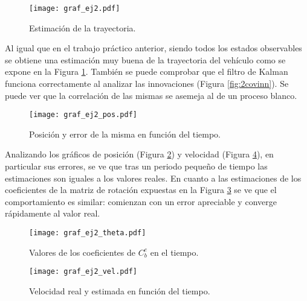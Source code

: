 
\begin{figure}[H]
\centering
\texttt{[image: graf\_ej2.pdf]}
\caption{Estimación de la trayectoria.}
\label{fig:ej2} 
\end{figure}
	Al igual que en el trabajo práctico anterior, siendo todos los estados observables se obtiene una estimación muy buena de la trayectoria del vehículo como se expone en la Figura \ref{fig:ej2}. También se puede comprobar que el filtro de Kalman funciona correctamente al analizar las innovaciones (Figura \ref{fig:2covinn}). Se puede ver que la correlación de las mismas se asemeja al de un proceso blanco.

\vspace*{\fill}
\begin{figure}[H]
\centering
\texttt{[image: graf\_ej2\_pos.pdf]}
\caption{Posición y error de la misma en función del tiempo.}
\label{fig:2pos} 
\end{figure}
\vspace*{\fill}

	Analizando los gráficos de posición (Figura \ref{fig:2pos}) y velocidad (Figura \ref{fig:2vel}), en particular sus errores, se ve que tras un periodo pequeño de tiempo las estimaciones son iguales a los valores reales. En cuanto a las estimaciones de los coeficientes de la matriz de rotación expuestas en la Figura \ref{fig:2theta} se ve que el comportamiento es similar: comienzan con un error apreciable y converge rápidamente al valor real.

\vspace*{\fill}

\pagebreak


\vspace*{\fill}
\begin{figure}[H]
\centering
\texttt{[image: graf\_ej2\_theta.pdf]}
\caption{Valores de los coeficientes de $C^e_b$ en el tiempo.}
\label{fig:2theta} 
\end{figure}
\vspace*{\fill}


\begin{figure}[H]
\centering
\texttt{[image: graf\_ej2\_vel.pdf]}
\caption{Velocidad real y estimada en función del tiempo.}
\label{fig:2vel} 
\end{figure}
\vspace*{\fill}
